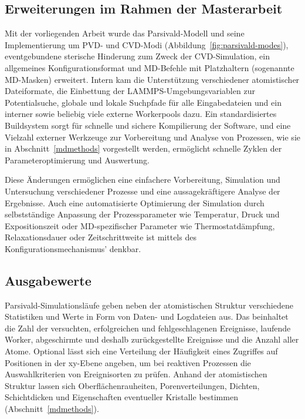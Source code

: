 \subsection{Erweiterungen im Rahmen der Masterarbeit}

Mit der vorliegenden Arbeit wurde das Parsivald-Modell und seine Implementierung um PVD- und CVD-Modi (Abbildung~\ref{fig:parsivald-modes}), eventgebundene sterische Hinderung zum Zweck der CVD-Simu\-lation, ein allgemeines Konfigurationsformat und MD-Befehle mit Platzhaltern (sogenannte MD-Masken) erweitert.
Intern kam die Unterstützung verschiedener atomistischer Dateiformate, die Einbettung der LAMMPS-Umgebungs\-variablen zur Potentialsuche, globale und lokale Suchpfade für alle Eingabedateien und ein interner sowie beliebig viele externe Workerpools dazu.
Ein standardisiertes Buildsystem sorgt für schnelle und sichere Kompilierung der Software, und eine Vielzahl externer Werkzeuge zur Vorbereitung und Analyse von Prozessen, wie sie in Abschnitt~\ref{mdmethods} vorgestellt werden, ermöglicht schnelle Zyklen der Parameteroptimierung und Auswertung.

Diese Änderungen ermöglichen eine einfachere Vorbereitung, Simulation und Untersuchung verschiedener Prozesse und eine aussagekräftigere Analyse der Ergebnisse.
Auch eine automatisierte Optimierung der Simulation durch selbstständige Anpassung der Prozessparameter wie Temperatur, Druck und Expositionszeit oder MD-spezifischer Parameter wie Thermostatdämpfung, Relaxationsdauer oder Zeitschrittweite ist mittels des Konfigurationsmechanismus' denkbar.


\subsection{Ausgabewerte}

Parsivald-Simulationsläufe geben neben der atomistischen Struktur verschiedene Statistiken und Werte in Form von Daten- und Logdateien aus.
Das beinhaltet die Zahl der versuchten, erfolgreichen und fehlgeschlagenen Ereignisse, laufende Worker, abgeschirmte und deshalb zurückgestellte Ereignisse und die Anzahl aller Atome.
Optional lässt sich eine Verteilung der Häufigkeit eines Zugriffes auf Positionen in der xy-Ebene angeben, um bei reaktiven Prozessen die Auswahlkriterien von Ereignisorten zu prüfen.
Anhand der atomistischen Struktur lassen sich Oberflächenrauheiten, Porenverteilungen, Dichten, Schichtdicken und Eigenschaften eventueller Kristalle bestimmen (Abschnitt~\ref{mdmethods}).

